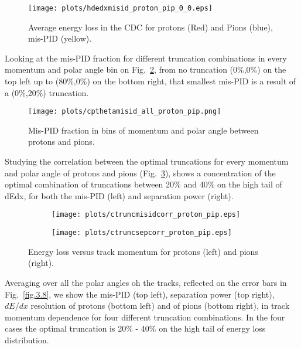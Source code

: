 \begin{figure}[H]
    \centering
    \texttt{[image: plots/hdedxmisid\_proton\_pip\_0\_0.eps]}
    \caption{\label{fig.3.5}Average energy loss in the CDC for protons (Red) and Pions (blue), mis-PID (yellow).}
\end{figure}
Looking at the mis-PID fraction for different truncation combinations in every momentum and polar angle bin on Fig.~\ref{fig.3.6}, from no truncation (0$\%$,0$\%$) on the top left up to (80$\%$,0$\%$) on the bottom right, that smallest mis-PID is a result of a (0$\%$,20$\%$) truncation.
\begin{figure}[H]
    \centering
    \texttt{[image: plots/cpthetamisid\_all\_proton\_pip.png]}
    \caption{\label{fig.3.6}Mis-PID fraction in bins of momentum and polar angle between protons and pions.}
\end{figure}
Studying the correlation between the optimal truncations for every momentum and polar angle of protons and pions (Fig.~\ref{fig.3.7}), shows a concentration of the optimal combination of truncations between 20$\%$ and 40$\%$ on the high tail of dEdx, for both the mis-PID (left) and separation power (right).
\begin{figure}[H]
    \centering
    \begin{subfigure}[b]{0.45\textwidth}
        \texttt{[image: plots/ctruncmisidcorr\_proton\_pip.eps]}
    \end{subfigure}\hfill
    \begin{subfigure}[b]{0.45\textwidth}
        \texttt{[image: plots/ctruncsepcorr\_proton\_pip.eps]}
    \end{subfigure}
    \caption{Energy loss versus track momentum for protons (left) and pions (right).}
    \label{fig.3.7}
\end{figure}

Averaging over all the polar angles oh the tracks, reflected on the error bars in Fig.~\ref{fig.3.8}, we show the mis-PID (top left), separation power (top right), $dE/dx$ resolution of protons (bottom left) and of pions (bottom right), in track momentum dependence for four different truncation combinations. In the four cases the optimal truncation is 20$\%$ - 40$\%$ on the high tail of energy loss distribution.

